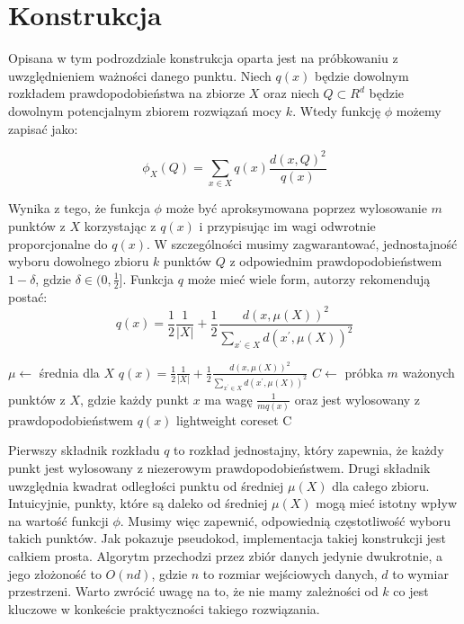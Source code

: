 \section{Konstrukcja}\label{construction}

Opisana w tym podrozdziale konstrukcja oparta jest na próbkowaniu z uwzględnieniem ważności danego punktu.
Niech $q(x)$ będzie dowolnym rozkładem prawdopodobieństwa na zbiorze $X$ oraz niech $Q \subset R^{d}$ będzie dowolnym potencjalnym zbiorem rozwiązań mocy $k$. 
Wtedy funkcję $\phi$ możemy zapisać jako:

\begin{equation}
    \phi_{X}(Q) = \sum_{x \in X} q(x) \frac{d(x, Q)^{2}}{q(x)}
\end{equation}

\noindent
Wynika z tego, że funkcja $\phi$ może być aproksymowana poprzez wylosowanie $m$ punktów z $X$ korzystając z $q(x)$ i przypisując im wagi odwrotnie proporcjonalne do $q(x)$.
W szczególności musimy zagwarantować, jednostajność wyboru dowolnego zbioru $k$ punktów $Q$ z odpowiednim prawdopodobieństwem $1 - \delta$, gdzie $\delta \in (0, \frac{1}{2}]$.
Funkcja $q$ może mieć wiele form, autorzy \cite{bachem2017scalable} rekomendują postać:
\begin{equation}
    q(x) = \frac{1}{2}\frac{1}{|X|} + \frac{1}{2}\frac{d(x, \mu(X))^2}{\sum_{x^{'} \in X}d(x^{'}, \mu(X))^2}
\end{equation}

\begin{algorithm}
    \caption{}
\begin{algorithmic}
        \State $\mu \leftarrow$ średnia dla $X$
            \State $q(x) = \frac{1}{2}\frac{1}{|X|} + \frac{1}{2}\frac{d(x, \mu(X))^2}{\sum_{x^{'} \in X}d(x^{'}, \mu(X))^2}$
        \EndFor
        \State $C \leftarrow$ próbka $m$ ważonych punktów z $X$, gdzie każdy punkt $x$ ma wagę $\frac{1}{mq(x)}$ oraz jest wylosowany z prawdopodobieństwem $q(x)$
    \EndProcedure
    \Return lightweight coreset C
\end{algorithmic}
\end{algorithm}

\noindent
Pierwszy składnik rozkładu $q$ to rozkład jednostajny, który zapewnia, że każdy punkt jest wylosowany z niezerowym prawdopodobieństwem.
Drugi składnik uwzględnia kwadrat odległości punktu od średniej $\mu(X)$ dla całego zbioru.
Intuicyjnie, punkty, które są daleko od średniej $\mu(X)$ mogą mieć istotny wpływ na wartość funkcji $\phi$.
Musimy więc zapewnić, odpowiednią częstotliwość wyboru takich punktów. 
Jak pokazuje pseudokod, implementacja takiej konstrukcji jest całkiem prosta.
Algorytm przechodzi przez zbiór danych jedynie dwukrotnie, a jego złożoność to $O(nd)$, gdzie $n$ to rozmiar wejściowych danych, $d$ to wymiar przestrzeni. 
Warto zwrócić uwagę na to, że nie mamy zależności od $k$ co jest kluczowe w konkeście praktyczności takiego rozwiązania.
